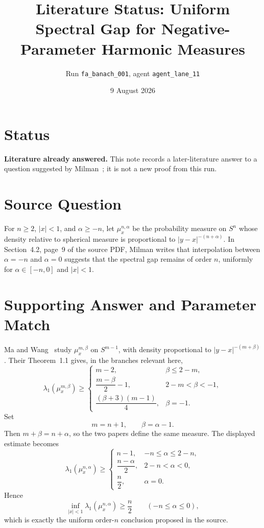 \documentclass[11pt]{article}
\title{Literature Status: Uniform Spectral Gap for Negative-Parameter Harmonic Measures}
\author{Run \texttt{fa\_banach\_001}, agent \texttt{agent\_lane\_11}}
\date{9 August 2026}
\begin{document}
\maketitle

\section*{Status}

\textbf{Literature already answered.} This note records a later-literature
answer to a question suggested by Milman~\cite{Milman}; it is not a new proof
from this run.

\section*{Source Question}

For $n\geq 2$, $|x|<1$, and $\alpha\geq-n$, let $\mu_x^{n,\alpha}$ be the
probability measure on $S^n$ whose density relative to spherical measure is
proportional to $|y-x|^{-(n+\alpha)}$. In Section~4.2, page~9 of the source
PDF, Milman writes that interpolation between $\alpha=-n$ and $\alpha=0$
suggests that the spectral gap remains of order $n$, uniformly for
$\alpha\in[-n,0]$ and $|x|<1$.

\section*{Supporting Answer and Parameter Match}

Ma and Wang~\cite{MaWang} study $\mu_x^{m,\beta}$ on $S^{m-1}$, with density
proportional to $|y-x|^{-(m+\beta)}$. Their Theorem~1.1 gives, in the branches
relevant here,
\[
 \lambda_1(\mu_x^{m,\beta})\geq
 \begin{cases}
  m-2, & \beta\leq 2-m,\\[2mm]
  \dfrac{m-\beta}{2}-1, & 2-m<\beta<-1,\\[2mm]
  \dfrac{(\beta+3)(m-1)}{4}, & \beta=-1.
 \end{cases}
\]
Set
\[
 m=n+1,\qquad \beta=\alpha-1.
\]
Then $m+\beta=n+\alpha$, so the two papers define the same measure. The
displayed estimate becomes
\[
 \lambda_1(\mu_x^{n,\alpha})\geq
 \begin{cases}
  n-1, & -n\leq\alpha\leq 2-n,\\[1mm]
  \dfrac{n-\alpha}{2}, & 2-n<\alpha<0,\\[2mm]
  \dfrac n2, & \alpha=0.
 \end{cases}
\]
Hence
\[
 \inf_{|x|<1}\lambda_1(\mu_x^{n,\alpha})\geq \frac n2
 \qquad(-n\leq\alpha\leq0),
\]
which is exactly the uniform order-$n$ conclusion proposed in the source.
\end{document}
